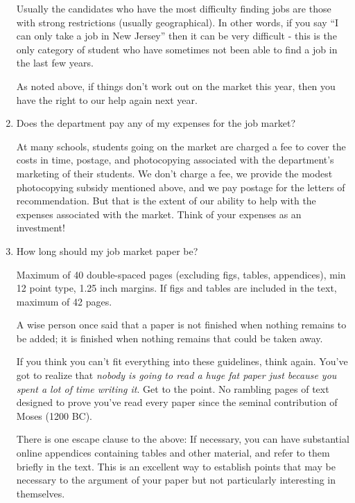 \documentclass{econtex}
\begin{document}
\begin{enumerate}
Usually the candidates who have the most difficulty finding jobs are
those with strong restrictions (usually geographical).  In other
words, if you say ``I can only take a job in New Jersey'' then it can
be very difficult - this is the only category of student who 
have sometimes not been able to find a job in the last few years.

As noted above, if things don't work out on the market this year, then
you have the right to our help again next year.

\item Does the department pay any of my expenses for the job market?
  
  At many schools, students going on the market are charged a fee to
  cover the costs in time, postage, and photocopying associated with
  the department's marketing of their students.  We don't charge a
  fee, we provide the modest photocopying subsidy mentioned above, and
  we pay postage for the letters of recommendation.  But that is the
  extent of our ability to help with the expenses associated with the
  market.  Think of your expenses as an investment!


\item How long should my job market paper be?
  
  Maximum of 40 double-spaced pages (excluding figs, tables,
  appendices), min 12 point type, 1.25 inch margins.  If figs and
  tables are included in the text, maximum of 42 pages.   
  
  A wise person once said that a paper is not finished when nothing
  remains to be added; it is finished when nothing remains that could
  be taken away.
  
  If you think you can't fit everything into these guidelines, think
  again.  You've got to realize that {\it nobody is going to read a
    huge fat paper just because you spent a lot of time writing it}.
  Get to the point.  No rambling pages of text designed to prove you've
  read every paper since the seminal contribution of Moses (1200 BC).
  
  There is one escape clause to the above: If necessary, you can have
  substantial online appendices containing tables and other material, and
  refer to them briefly in the text.  This is an excellent way to
  establish points that may be necessary to the argument of your paper
  but not particularly interesting in themselves.   


\end{enumerate}
\end{document}
